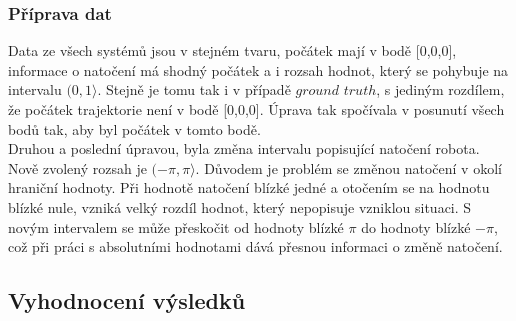 \documentclass[12pt]{article}
\begin{document}
\subsubsection{Příprava dat}
Data ze všech systémů jsou v stejném tvaru, počátek mají v bodě [0,0,0], informace o natočení má shodný počátek a i rozsah hodnot, který se pohybuje na intervalu $(0,1\rangle$. Stejně je tomu tak i v případě $ground$ $truth$, s jediným rozdílem, že počátek trajektorie není v bodě [0,0,0]. Úprava tak spočívala v posunutí všech bodů tak, aby byl počátek v tomto bodě.\\
Druhou a poslední úpravou, byla změna intervalu popisující natočení robota. Nově zvolený rozsah je $(-\pi,\pi\rangle$. Důvodem je problém se změnou natočení v okolí hraniční hodnoty. Při hodnotě natočení blízké jedné a otočením se na hodnotu blízké nule, vzniká velký rozdíl hodnot, který nepopisuje vzniklou situaci. S novým intervalem se může přeskočit od hodnoty blízké $\pi$ do hodnoty blízké $-\pi$, což při práci s absolutními hodnotami dává přesnou informaci o změně natočení. 

\newpage

\subsection{Vyhodnocení výsledků}
\end{document}
